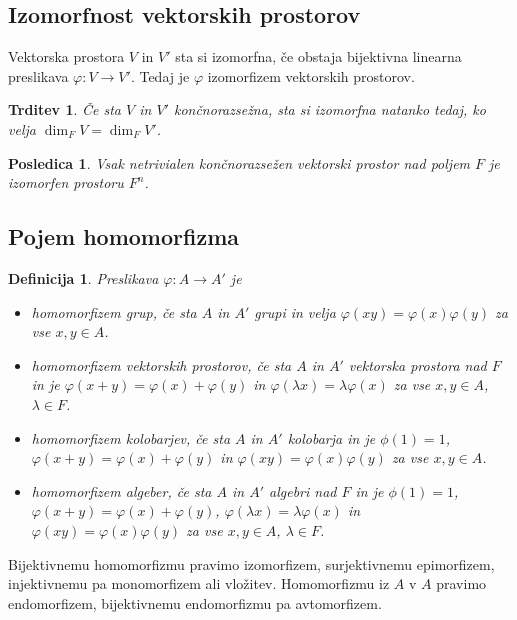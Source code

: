 \documentclass[10pt, a4paper]{article}
\newtheorem{posledica}[izr]{Posledica}
\newtheorem{trditev}[izr]{Trditev}
\newtheorem{defi}{Definicija}[section]
\newenvironment{noticeB}{%
  \tcolorbox[%
  notitle,
  empty,
  enhanced,  %
  breakable,
  coltext=black,
  colback=white, 
  fontupper=\rmfamily,
  parbox=false,
  noparskip,
  sharp corners,
  boxrule=-1pt,  %
  frame hidden,
  left=7pt,  %
  right=7pt,
  top=5pt,
  bottom=5pt,
  before skip=2.5ex plus 2pt,
  after skip=2.5ex plus 2pt,
  borderline west = {1.5pt}{-0.1pt}{blue!30!black}, %
  overlay unbroken and last={%
    \draw[color=black, line width=1.25pt]
    ($(frame.south west)+(1.pt, -0.1pt)$) -- ++(2em, 0);
  }
  ]}
{\endtcolorbox}
\newenvironment{definicija}{\begin{defi}\begin{noticeB}}{%
    \end{noticeB}\end{defi}}
\begin{document}
\subsection{Izomorfnost vektorskih prostorov}

Vektorska prostora $V$ in $V'$ sta si izomorfna, če obstaja bijektivna linearna preslikava
$\varphi: V \to V'$. Tedaj je $\varphi$ izomorfizem vektorskih prostorov.

\begin{trditev}
  Če sta $V$ in $V'$ končnorazsežna, sta si izomorfna natanko tedaj, ko velja $\dim_F V = \dim_F V'$.
\end{trditev}

\begin{posledica}
  Vsak netrivialen končnorazsežen vektorski prostor nad poljem $F$ je izomorfen prostoru $F^n$.
\end{posledica}

\subsection{Pojem homomorfizma}

\begin{definicija}
  Preslikava $\varphi: A \to A'$ je 
  \begin{itemize}
    \item homomorfizem grup, če sta $A$ in $A'$ grupi in velja $\varphi(xy) = \varphi(x) \varphi(y)$ za vse $x, y \in A$.
    \item homomorfizem vektorskih prostorov, če sta $A$ in $A'$ vektorska prostora nad $F$ in je $\varphi (x + y) = \varphi(x) + \varphi(y)$ 
    in $\varphi(\lambda x) = \lambda \varphi(x)$ za vse $x,y \in A$, $\lambda \in F$.
    \item homomorfizem kolobarjev, če sta $A$ in $A'$ kolobarja in je $\phi(1) = 1$, $\varphi (x + y) = \varphi(x) + \varphi(y)$ 
    in $\varphi(xy) = \varphi(x) \varphi(y)$ za vse $x,y \in A$.
    \item homomorfizem algeber, če sta $A$ in $A'$ algebri nad $F$ in je $\phi(1) = 1$, $\varphi (x + y) = \varphi(x) + \varphi(y)$, $\varphi(\lambda x) = \lambda \varphi(x)$ 
    in $\varphi(xy) = \varphi(x) \varphi(y)$ za vse $x,y \in A$, $\lambda \in F$.
  \end{itemize}
\end{definicija}

Bijektivnemu homomorfizmu pravimo izomorfizem, surjektivnemu epimorfizem, 
injektivnemu pa monomorfizem ali vložitev.
Homomorfizmu iz $A$ v $A$ pravimo endomorfizem, bijektivnemu endomorfizmu pa avtomorfizem.
\end{document}
